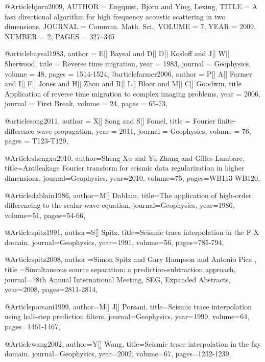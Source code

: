 @Article{bjorn2009,
   AUTHOR = {Engquist, Bj{\"o}rn and Ying, Lexing},
   TITLE = {A fast directional algorithm for high frequency acoustic 
            scattering in two dimensions},
   JOURNAL = {Commun. Math. Sci.}, 
   VOLUME = {7}, 
   YEAR = {2009}, 
   NUMBER = {2},
   PAGES = {327--345} 
}

@article{baysal1983,
  author =	 {E[] Baysal and D[] D[] Kosloff and J[] W[] Sherwood},
  title =	 {Reverse time migration},
  year =	 1983,
  journal =	 {Geophysics},
  volume =	 48,
  pages =	 {1514-1524},
}
@article{farmer2006,
  author =	 {P[] A[] Farmer and I[] F[] Jones and H[] Zhou and R[] L[] Bloor and M[] C[] Goodwin},
  title =	 {Application of reverse time migration to complex imaging problems},
  year =	 2006,
  journal =	 {First Break},
  volume =	 24,
  pages =	 {65-73},
}

@article{song2011,
  author =	 {X[] Song and S[] Fomel},
  title =	 {{F}ourier finite-difference wave propagation},
  year =	 2011,
  journal =	 {Geophysics},
  volume =	 76,
  pages =	 {T123-T129},
}

@Article{shengxu2010,
  author={Sheng Xu and Yu Zhang and Gilles Lambare},
  title={Antileakage {F}ourier transform for seismic data regularization in higher dimensions},
  journal={Geophysics},
  year=2010,
  volume=75,
  pages={WB113-WB120},
}

@Article{dablain1986,
  author={M[] Dablain},
  title={The application of high-order differencing to the scalar wave equation},
  journal={Geophysics},
  year=1986,
  volume=51,
  pages={54-66},
}

@Article{spitz1991,
  author={S[] Spitz},
  title={Seismic trace interpolation in the F-X domain},
  journal={Geophysics},
  year=1991,
  volume=56,
  pages={785-794},
}

@Article{spitz2008,
  author ={Simon Spitz and Gary Hampson and Antonio Pica },
  title ={Simultaneous source separation: a prediction-subtraction approach},
  journal={78th Annual International Meeting, SEG, Expanded Abstracts},
  year=2008,
  pages={2811-2814},
}

@Article{porsani1999,
  author={M[] J[] Porsani},
  title={Seismic trace interpolation using half-step prediction filters},
  journal={Geophysics},
  year=1999,
  volume=64,
  pages={1461-1467},
}

@Article{wang2002,
  author={Y[] Wang},
  title={Seismic trace interpolation in the fxy domain},
  journal={Geophysics},
  year=2002,
  volume=67,
  pages={1232-1239},
}

